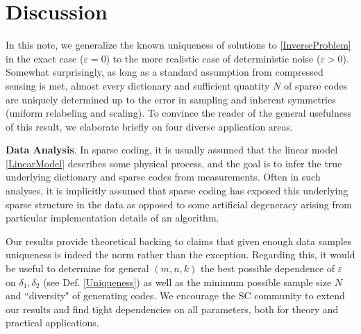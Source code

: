 \documentclass[journal, twocolumn]{IEEEtran}
\begin{document}


\section{Discussion}\label{Discussion}

In this note, we generalize the known uniqueness of solutions to \eqref{InverseProblem} in the exact case ($\varepsilon = 0$) to the more realistic case of deterministic noise ($\varepsilon > 0$).  Somewhat surprisingly, as long as a standard assumption from compressed sensing is met, almost every dictionary and sufficient quantity $N$ of sparse codes are uniquely determined up to the error in sampling and inherent symmetries (uniform relabeling and scaling). To convince the reader of the general usefulness of this result, we elaborate briefly on four diverse application areas.


\textbf{Data Analysis}.  
In sparse coding, it is usually assumed that the linear model \eqref{LinearModel} describes some physical process, and the goal is to infer the true underlying dictionary and sparse codes from measurements. Often in such analyses, it is implicitly assumed that sparse coding has exposed this underlying sparse structure in the data as opposed to some artificial degeneracy arising from particular implementation details of an algorithm. 

Our results provide theoretical backing to claims that given enough data samples uniqueness is indeed the norm rather than the exception. Regarding this, it would be useful to determine for general $(m,n,k)$ the best possible dependence of $\varepsilon$ on $\delta_1, \delta_2$ (see Def. \ref{Uniqueness}) as well as the minimum possible sample size $N$ and ``diversity" of generating codes. We encourage the SC community to extend our results and find tight dependencies on all parameters, both for theory and practical applications.
\end{document}
